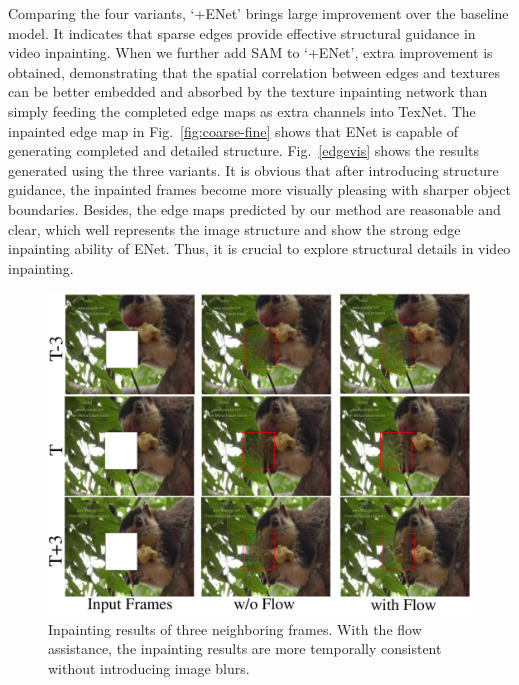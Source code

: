  
 
Comparing the four variants, `+ENet' brings large improvement over the baseline model.
It indicates that sparse edges provide effective structural guidance in video inpainting.
When we further add SAM to `+ENet', extra improvement is obtained, demonstrating that the spatial correlation between edges and textures can be better embedded and absorbed by the texture inpainting network than simply feeding the completed edge maps as extra channels into TexNet.
The inpainted edge map in Fig.~\ref{fig:coarse-fine} shows that ENet is capable of generating completed and detailed structure.
Fig.~\ref{edgevis} shows the results generated using the three variants. 
It is obvious that after introducing structure guidance, the inpainted frames become more visually pleasing with sharper object boundaries. 
Besides, the edge maps predicted by our method are reasonable and clear, which well represents the image structure and show the strong edge inpainting ability of ENet. 
Thus, it is crucial to explore structural details in video inpainting.




\begin{figure}[t]
	\centering
	\includegraphics[width=0.9\columnwidth]{flow_vis} %
	\caption{Inpainting results of three neighboring frames. With the flow assistance, the inpainting results are more temporally consistent without introducing image blurs. }
	\label{flow_vis}
\end{figure}

